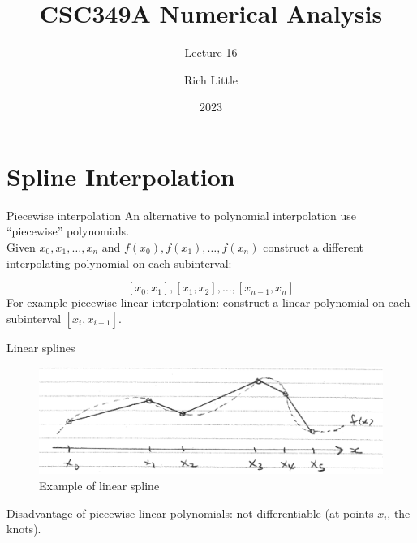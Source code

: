 \documentclass[12pt]{beamer}
\title[CSC349A Numerical Analysis]{CSC349A Numerical Analysis}
\subtitle[Lecture 16]{Lecture 16}
\date[2023]{2023}
\author[R. Little]{Rich Little}
\institute[University of Victoria]{University of Victoria}
\begin{document}
\frame{\maketitle} %




\section{Spline Interpolation} 


\begin{frame}{Piecewise interpolation} 
An alternative to polynomial interpolation use ``piecewise'' polynomials. 
\\
Given $x_0, x_1, \dots, x_n$ and $f(x_0), f(x_1), \dots, f(x_n)$ 
construct a different interpolating polynomial on each subinterval: 

\[
[x_0, x_1], [x_1, x_2], \dots, [x_{n-1}, x_n] 
\]
\noindent 
For example piecewise linear interpolation: construct a linear polynomial on each subinterval $[x_i, x_{i+1}]$. 
\end{frame} 

\begin{frame}{Linear splines}
\begin{figure} 
  \centering
  \includegraphics[scale=0.4]{linear_splines}
  \caption{Example of linear spline}
  \label{fig:linear}
\end{figure}


Disadvantage of piecewise linear polynomials: 
not differentiable (at points $x_i$, the knots). 
\end{frame} 
\end{document}

